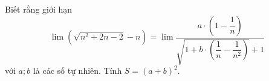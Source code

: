 \begin{ex}
Biết rằng giới hạn \[\lim\left(\sqrt{n^2+2n-2}-n\right)=\lim\dfrac{a\cdot\left(1-\dfrac1n\right)}{\sqrt{1+b\cdot\left(\dfrac1n-\dfrac1{n^2}\right)}+1}\] với $a;b$ là các số tự nhiên. Tính $S=(a+b)^2$.
\end{ex}
